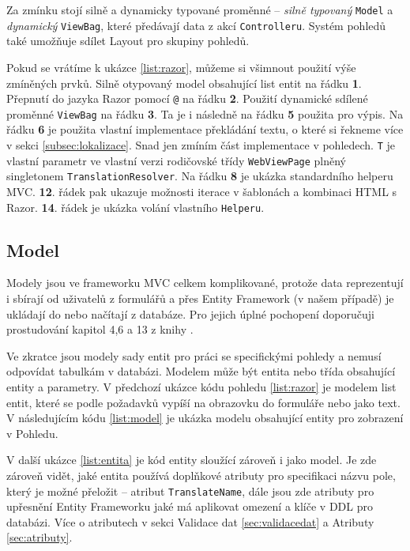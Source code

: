 \documentclass[11pt,twoside,a4paper]{book}
\begin{document}
Za zmínku stojí silně a dynamicky typované proměnné -- \textit{silně typovaný} \texttt{Model} a \textit{dynamický} \texttt{ViewBag}, které předávají data z akcí \texttt{Controlleru}. Systém pohledů také umožňuje sdílet \textsf{Layout} pro skupiny pohledů.

Pokud se vrátíme k ukázce \ref{list:razor}, můžeme si všimnout použití výše zmíněných prvků. Silně otypovaný model obsahující list entit na řádku \textbf{1}. Přepnutí do jazyka \textsf{Razor} pomocí \texttt{@} na řádku \textbf{2}. Použití dynamické sdílené proměnné \texttt{ViewBag} na řádku \textbf{3}. Ta je i následně na řádku \textbf{5} použita pro výpis. Na řádku \textbf{6} je použita vlastní implementace překládání textu, o které si řekneme více v sekci \ref{subsec:lokalizace}. Snad jen zmíním část implementace v pohledech. \texttt{T} je vlastní parametr ve vlastní verzi rodičovské třídy \texttt{WebViewPage} plněný singletonem \texttt{TranslationResolver}. Na řádku \textbf{8} je ukázka standardního helperu MVC. \textbf{12}. řádek pak ukazuje možnosti iterace v šablonách a kombinaci HTML s \textsf{Razor}. \textbf{14}. řádek je ukázka volání vlastního \texttt{Helperu}.

\subsection{Model}
Modely jsou ve frameworku MVC celkem komplikované, protože data reprezentují i sbírají od uživatelů z formulářů a přes Entity Framework (v našem případě) je ukládají do nebo načítají z databáze. Pro jejich úplné pochopení doporučuji prostudování kapitol 4,6 a 13 z knihy \cite{MVC1}.

Ve zkratce jsou modely sady entit pro práci se specifickými \textsf{pohledy} a nemusí  odpovídat tabulkám v databázi. Modelem může být entita nebo třída obsahující entity a parametry. V předchozí ukázce kódu \textsf{pohledu} \ref{list:razor} je modelem list entit, které se podle požadavků vypíší na obrazovku do formuláře nebo jako text. V následujícím kódu \ref{list:model} je ukázka modelu obsahující entity pro zobrazení v \textsf{Pohledu}. 

V další ukázce \ref{list:entita} je kód entity sloužící zároveň i jako model. Je zde zároveň vidět, jaké entita používá doplňkové \textsf{atributy} pro specifikaci názvu pole, který je možné přeložit -- atribut \texttt{TranslateName}, dále jsou zde atributy pro upřesnění Entity Frameworku jaké má  aplikovat omezení a klíče v DDL pro databázi. Více o atributech v sekci Validace dat \ref{sec:validacedat} a Atributy \ref{sec:atributy}.
\end{document}
